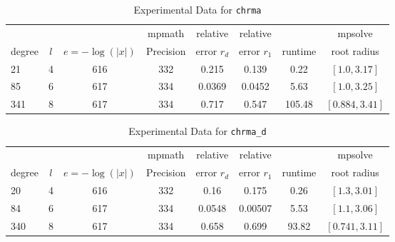 \documentclass[sigconf]{acmart}
\begin{document}
\begin{table}[t]
\caption{Experimental Data for \texttt{chrma}} %
\label{tab:chrma}
\vskip -0.15in
\begin{center}
\begin{small}
\begin{sc}
\begin{tabular}{lccccccc}
\toprule
&  &  & mpmath & relative  & relative &  & mpsolve \\
degree  & $l$& $e=-\log(|x|)$& Precision &error $r_d$       & error $r_1$ &runtime& root radius\\
\midrule
 21 & 4 & 616 & 332 & 0.215 & 0.139 & 0.22 & $[1.0, 3.17]$\\
 85 & 6 & 617 & 334 & 0.0369 & 0.0452 & 5.63 & $[1.0, 3.25]$\\
 341 & 8 & 617 & 334 & 0.717 & 0.547 & 105.48 & $[0.884, 3.41]$\\
\bottomrule
\end{tabular}
\end{sc}
\end{small}
\end{center}
\vskip 0.05in
\end{table}


\begin{table}[t]
\caption{Experimental Data for \texttt{chrma\_d}} %
\label{tab:chrma_d}
\vskip -0.15in
\begin{center}
\begin{small}
\begin{sc}
\begin{tabular}{lccccccc}
\toprule
&  &  & mpmath & relative  & relative &  & mpsolve \\
degree  & $l$& $e=-\log(|x|)$& Precision &error $r_d$       & error $r_1$ &runtime& root radius\\
\midrule
20 & 4 & 616 & 332 & 0.16 & 0.175 & 0.26 & $[1.3, 3.01]$\\
 84 & 6 & 617 & 334 & 0.0548 & 0.00507 & 5.53 & $[1.1, 3.06]$\\
 340 & 8 & 617 & 334 & 0.658 & 0.699 & 93.82 & $[0.741, 3.11]$\\
\bottomrule
\end{tabular}
\end{sc}
\end{small}
\end{center}
\vskip 0.05in
\end{table}
\end{document}
